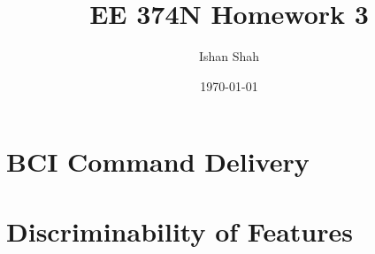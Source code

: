 \documentclass[12pt]{article}
\begin{document}
\title{EE 374N Homework 3}
\author{Ishan Shah}
\date{\today}
\maketitle

\section{BCI Command Delivery}

\section{Discriminability of Features}
\end{document}
